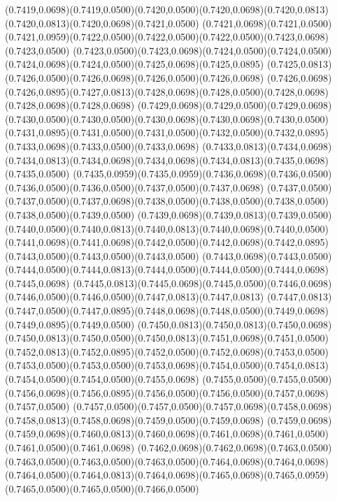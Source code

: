 (0.7419,0.0698)(0.7419,0.0500)(0.7420,0.0500)(0.7420,0.0698)(0.7420,0.0813)(0.7420,0.0813)(0.7420,0.0698)(0.7421,0.0500)
(0.7421,0.0698)(0.7421,0.0500)(0.7421,0.0959)(0.7422,0.0500)(0.7422,0.0500)(0.7422,0.0500)(0.7423,0.0698)(0.7423,0.0500)
(0.7423,0.0500)(0.7423,0.0698)(0.7424,0.0500)(0.7424,0.0500)(0.7424,0.0698)(0.7424,0.0500)(0.7425,0.0698)(0.7425,0.0895)
(0.7425,0.0813)(0.7426,0.0500)(0.7426,0.0698)(0.7426,0.0500)(0.7426,0.0698)
\PST@Solid(0.7426,0.0698)(0.7426,0.0895)(0.7427,0.0813)(0.7428,0.0698)(0.7428,0.0500)(0.7428,0.0698)(0.7428,0.0698)(0.7428,0.0698)
(0.7429,0.0698)(0.7429,0.0500)(0.7429,0.0698)(0.7430,0.0500)(0.7430,0.0500)(0.7430,0.0698)(0.7430,0.0698)(0.7430,0.0500)
(0.7431,0.0895)(0.7431,0.0500)(0.7431,0.0500)(0.7432,0.0500)(0.7432,0.0895)(0.7433,0.0698)(0.7433,0.0500)(0.7433,0.0698)
(0.7433,0.0813)(0.7434,0.0698)(0.7434,0.0813)(0.7434,0.0698)(0.7434,0.0698)(0.7434,0.0813)(0.7435,0.0698)(0.7435,0.0500)
(0.7435,0.0959)(0.7435,0.0959)(0.7436,0.0698)(0.7436,0.0500)(0.7436,0.0500)(0.7436,0.0500)(0.7437,0.0500)(0.7437,0.0698)
(0.7437,0.0500)(0.7437,0.0500)(0.7437,0.0698)(0.7438,0.0500)(0.7438,0.0500)(0.7438,0.0500)(0.7438,0.0500)(0.7439,0.0500)
(0.7439,0.0698)(0.7439,0.0813)(0.7439,0.0500)(0.7440,0.0500)(0.7440,0.0813)(0.7440,0.0813)(0.7440,0.0698)(0.7440,0.0500)
(0.7441,0.0698)(0.7441,0.0698)(0.7442,0.0500)(0.7442,0.0698)(0.7442,0.0895)(0.7443,0.0500)(0.7443,0.0500)(0.7443,0.0500)
(0.7443,0.0698)(0.7443,0.0500)(0.7444,0.0500)(0.7444,0.0813)(0.7444,0.0500)(0.7444,0.0500)(0.7444,0.0698)(0.7445,0.0698)
(0.7445,0.0813)(0.7445,0.0698)(0.7445,0.0500)(0.7446,0.0698)(0.7446,0.0500)(0.7446,0.0500)(0.7447,0.0813)(0.7447,0.0813)
(0.7447,0.0813)(0.7447,0.0500)(0.7447,0.0895)(0.7448,0.0698)(0.7448,0.0500)(0.7449,0.0698)(0.7449,0.0895)(0.7449,0.0500)
(0.7450,0.0813)(0.7450,0.0813)(0.7450,0.0698)(0.7450,0.0813)(0.7450,0.0500)(0.7450,0.0813)(0.7451,0.0698)(0.7451,0.0500)
(0.7452,0.0813)(0.7452,0.0895)(0.7452,0.0500)(0.7452,0.0698)(0.7453,0.0500)
\PST@Solid(0.7453,0.0500)(0.7453,0.0500)(0.7453,0.0698)(0.7454,0.0500)(0.7454,0.0813)(0.7454,0.0500)(0.7454,0.0500)(0.7455,0.0698)
(0.7455,0.0500)(0.7455,0.0500)(0.7456,0.0698)(0.7456,0.0895)(0.7456,0.0500)(0.7456,0.0500)(0.7457,0.0698)(0.7457,0.0500)
(0.7457,0.0500)(0.7457,0.0500)(0.7457,0.0698)(0.7458,0.0698)(0.7458,0.0813)(0.7458,0.0698)(0.7459,0.0500)(0.7459,0.0698)
(0.7459,0.0698)(0.7459,0.0698)(0.7460,0.0813)(0.7460,0.0698)(0.7461,0.0698)(0.7461,0.0500)(0.7461,0.0500)(0.7461,0.0698)
(0.7462,0.0698)(0.7462,0.0698)(0.7463,0.0500)(0.7463,0.0500)(0.7463,0.0500)(0.7463,0.0500)(0.7464,0.0698)(0.7464,0.0698)
(0.7464,0.0500)(0.7464,0.0813)(0.7464,0.0698)(0.7465,0.0698)(0.7465,0.0959)(0.7465,0.0500)(0.7465,0.0500)(0.7466,0.0500)
